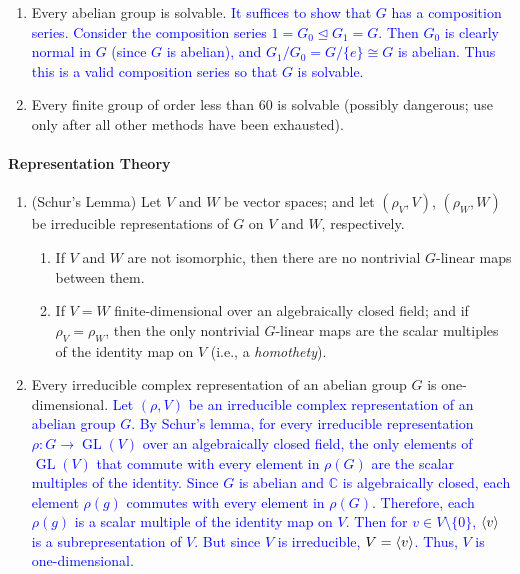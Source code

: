 \documentclass{article}
\newcommand{\expl}[1]{\textcolor{blue}{#1}}
\begin{document}
\begin{enumerate}[resume = algebra]
{\begin{equation*}
		\end{equation*}
		Therefore, $G$ is solvable. 
		}
		\item Every abelian group is solvable. \newline \expl{
		It suffices to show that $G$ has a composition series. Consider the composition series $1 = G_{0} \trianglelefteq G_{1} = G$. Then $G_{0}$ is clearly normal in $G$ (since $G$ is abelian), and $G_{1}/G_{0} = G/\{e\} \cong G$ is abelian. Thus this is a valid composition series so that $G$ is solvable. 
		}
		\item Every finite group of order less than 60 is solvable (possibly dangerous; use only after all other methods have been exhausted). 
	\end{enumerate}
	\paragraph{Representation Theory}
	\begin{enumerate}[resume=algebra]
		\item (Schur's Lemma) Let $V$ and $W$ be vector spaces; and let $(\rho_{V}, V)$, $(\rho_{W}, W)$ be irreducible representations of $G$ on $V$ and $W$, respectively. \vspace{-0.25cm}
		\begin{enumerate}[itemsep =-2pt,label = (\alph{*})]
			\item If $V$ and $W$ are not isomorphic, then there are no nontrivial $G$-linear maps between them. 
			\item If $V = W$ finite-dimensional over an algebraically closed field; and if $\rho_{V} = \rho_{W}$, then the only nontrivial $G$-linear maps are the scalar multiples of the identity map on $V$ (i.e., a \textit{homothety}). 
		\end{enumerate}
		\item Every irreducible complex representation of an abelian group $G$ is one-dimensional. \newline \expl{
			Let $(\rho, V)$ be an irreducible complex representation of an abelian group $G$. By Schur's lemma, for every irreducible representation $\rho: G \to  \operatorname{GL}(V)$ over an algebraically closed field, the only elements of $\operatorname{GL}(V)$ that commute with every element in $\rho(G)$ are the scalar multiples of the identity. Since $G$ is abelian and $\mathbb{C}$ is algebraically closed, each element $\rho(g)$ commutes with every element in $\rho(G)$. Therefore, each $\rho(g)$ is a scalar multiple of the identity map on $V$. Then for $v \in V \setminus \{0\}$, $\braket{v}$ is a subrepresentation of $V$. But since $V$ is irreducible, $V  = \braket{v}$. Thus, $V$ is one-dimensional. 
		}
	\end{enumerate}
	\newpage 
\end{document}
